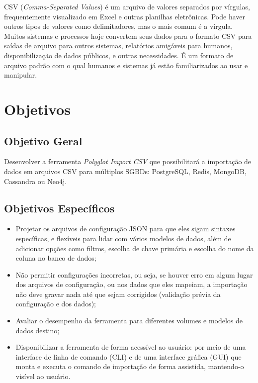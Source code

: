 CSV (\textit{Comma-Separated Values}) é um arquivo de valores separados por vírgulas,
frequentemente visualizado em Excel e outras planilhas eletrônicas. Pode haver outros tipos
de valores como delimitadores, mas o mais comum é a vírgula. Muitos sistemas e processos
hoje convertem seus dados para o formato CSV para saídas de arquivo para outros sistemas,
relatórios amigáveis para humanos, disponibilização de dados públicos, e outras
necessidades. É um formato de arquivo padrão com o qual humanos e sistemas já estão
familiarizados ao usar e manipular.

\section{Objetivos}

\subsection{Objetivo Geral}

Desenvolver a ferramenta \textit{Polyglot Import CSV} que possibilitará a importação de
dados em arquivos CSV para múltiplos SGBDs: PostgreSQL, Redis, MongoDB, Cassandra ou
Neo4j.

\subsection{Objetivos Específicos}

\begin{itemize}
  \item Projetar os arquivos de configuração JSON para que eles sigam sintaxes específicas,
        e flexíveis para lidar com vários modelos de dados, além de adicionar opções como
        filtros, escolha de chave primária e escolha do nome da coluna no banco de dados;
  \item Não permitir configurações incorretas, ou seja, se houver erro em algum lugar dos
        arquivos de configuração, ou nos dados que eles mapeiam, a importação não deve
        gravar nada até que sejam corrigidos (validação prévia da configuração e dos dados);
  \item Avaliar o desempenho da ferramenta para diferentes volumes e modelos de dados
        destino;
  \item Disponibilizar a ferramenta de forma acessível ao usuário: por meio de uma interface
        de linha de comando (CLI) e de uma interface gráfica (GUI) que monta e executa o
        comando de importação de forma assistida, mantendo-o visível ao usuário.
\end{itemize}

